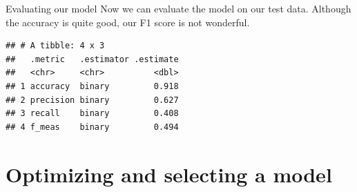 \documentclass[
  10pt,
  ignorenonframetext,
  aspectratio=169]{beamer}
\newenvironment{Shaded}{\begin{snugshade}}{\end{snugshade}}
\newcommand{\AttributeTok}[1]{\textcolor[rgb]{0.80,0.80,0.80}{#1}}
\newcommand{\FunctionTok}[1]{\textcolor[rgb]{0.94,0.94,0.56}{#1}}
\newcommand{\NormalTok}[1]{\textcolor[rgb]{0.80,0.80,0.80}{#1}}
\newcommand{\OtherTok}[1]{\textcolor[rgb]{0.94,0.94,0.56}{#1}}
\newcommand{\SpecialCharTok}[1]{\textcolor[rgb]{0.86,0.64,0.64}{#1}}
\newcommand{\StringTok}[1]{\textcolor[rgb]{0.80,0.58,0.58}{#1}}
\begin{document}
\begin{frame}[fragile]{Evaluating our model}
\protect\hypertarget{evaluating-our-model-1}{}
Now we can evaluate the model on our test data. Although the accuracy is
quite good, our F1 score is not wonderful.

\medskip
\scriptsize

\begin{Shaded}
\end{Shaded}

\begin{verbatim}
## # A tibble: 4 x 3
##   .metric   .estimator .estimate
##   <chr>     <chr>          <dbl>
## 1 accuracy  binary         0.918
## 2 precision binary         0.627
## 3 recall    binary         0.408
## 4 f_meas    binary         0.494
\end{verbatim}
\end{frame}

\hypertarget{optimizing-and-selecting-a-model}{%
\section{Optimizing and selecting a
model}\label{optimizing-and-selecting-a-model}}
\end{document}
